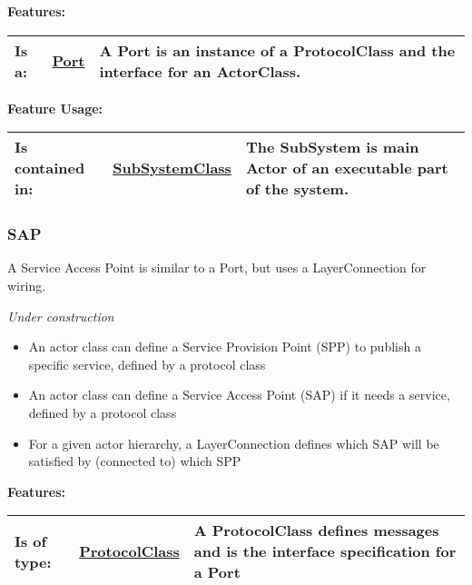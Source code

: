 		
		\begingroup
		\textbf{Features:}
		\renewcommand{\arraystretch}{1.8} %
		\begin{longtable}{l|l p{}}
			\hline
		Is a: & \tabitem \hyperlink{ref:Port}{Port}  & A Port is an instance of a ProtocolClass and the interface for an ActorClass.\\
		\hline
		\end{longtable}
		\endgroup
		
		\begingroup
		\textbf{Feature Usage:}
		\renewcommand{\arraystretch}{1.8} %
		\begin{longtable}{l|l p{}}
			\hline
		Is contained in: & \tabitem \hyperlink{ref:SubSystemClass}{SubSystemClass}  & The SubSystem is main Actor of an executable part of the system. \\
		\hline
		\end{longtable}
		\endgroup
		
		
	\vspace{\baselineskip}
	\vspace{\baselineskip}
	\vspace{\baselineskip}
	
	\subsubsection{SAP}
		\hypertarget{ref:SAP}{}
		
		A Service Access Point is similar to a Port, but uses a LayerConnection for wiring.
		
		\emph{\large Under construction}
		\begin{itemize}
		\item An actor class can define a Service Provision Point (SPP) to publish a specific service, defined by a protocol class
		\item An actor class can define a Service Access Point (SAP) if it needs a service, defined by a protocol class
		\item For a given actor hierarchy, a LayerConnection defines which SAP will be satisfied by (connected to) which SPP
		\end{itemize}
		
		
		\begingroup
		\textbf{Features:}
		\renewcommand{\arraystretch}{1.8} %
		\begin{longtable}{l|l p{}}
			\hline
		Is of type: & \tabitem \hyperlink{ref:ProtocolClass}{ProtocolClass}  & A ProtocolClass defines messages and is the interface specification for a Port\\
		\hline
		\end{longtable}
		\endgroup
		
